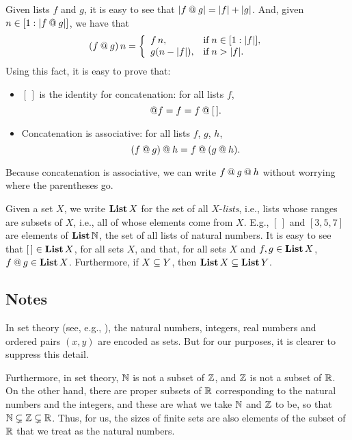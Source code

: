 Given lists $f$ and $g$, it is easy to see that $|f\mathbin{@} g| =
|f| + |g|$.  And, given $n\in[1:|f\mathbin{@} g|]$,
we have that
\begin{displaymath}
(f\myconcat g)\,n =
\casesdef{f\,n,}{\eqtxtr{if}n\in[1:|f|],}%
         {g(n-|f|),}{\eqtxtr{if}n>|f| .}
\end{displaymath}
Using this fact, it is easy to prove that:
\begin{itemize}
\item $[\,]$ is the identity for concatenation: for all lists $f$,
%
%
%
  \begin{displaymath}
    [\,]\myconcat f = f = f\myconcat [\,] .
  \end{displaymath}

\item Concatenation is associative: for all lists $f$, $g$, $h$,
%
%
%
  \begin{displaymath}
    (f\mathbin{@} g)\mathbin{@} h = f\mathbin{@}(g\mathbin{@} h) .
  \end{displaymath}
\end{itemize}
Because concatenation is associative, we can write
$f\mathbin{@} g\mathbin{@} h$ without worrying where the parentheses go.

Given a set $X$, we write $\mathbf{List}\,X$ for the set of all
$X$-\emph{lists}, i.e., lists whose
%
%
%
%
ranges are subsets of $X$, i.e., all of whose elements come
from $X$.  E.g., $[\,]$ and $[3,5,7]$ are elements of $\mathbf{List}\,\mathbb{N}$,
the set of all lists of natural numbers.  It is easy to see that
$[\,]\in\mathbf{List}\,X$, for all sets $X$, and that, for all sets $X$ and
$f,g\in\mathbf{List}\,X$, $f\mathbin{@} g\in\mathbf{List}\,X$. Furthermore, if $X\subseteq Y$,
then $\mathbf{List}\,X\subseteq\mathbf{List}\,Y$.
%
%

\subsection{Notes}

In set theory (see, e.g., \cite{Enderton77}), the natural numbers,
integers, real numbers and ordered pairs $(x,y)$ are encoded as sets.
But for our purposes, it is clearer to suppress this detail.

Furthermore, in set theory, $\mathbb{N}$ is not a subset of $\mathbb{Z}$, and
$\mathbb{Z}$ is not a subset of $\mathbb{R}$.  On the other hand, there are
proper subsets of $\mathbb{R}$ corresponding to the natural numbers and
the integers, and these are what we take $\mathbb{N}$ and $\mathbb{Z}$ to be, so
that $\mathbb{N}\subsetneq\mathbb{Z}\subsetneq\mathbb{R}$. Thus, for us, the sizes of
finite sets are also elements of the subset of $\mathbb{R}$ that we
treat as the natural numbers.
%

